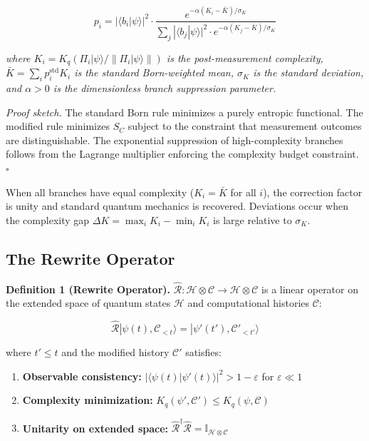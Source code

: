 \documentclass[12pt,a4paper]{article}
\newcommand{\ket}[1]{|#1\rangle}
\newcommand{\braket}[2]{\langle#1|#2\rangle}
\begin{document}
\begin{equation}
p_i = |\braket{b_i}{\psi}|^2 \cdot \frac{e^{-\alpha (K_i - \bar{K})/\sigma_K}}{\sum_j |\braket{b_j}{\psi}|^2 \cdot e^{-\alpha (K_j - \bar{K})/\sigma_K}}
\label{eq:born}
\end{equation}

\textit{where $K_i = K_q(\Pi_i\ket{\psi}/\|\Pi_i\ket{\psi}\|)$ is the post-measurement complexity, $\bar{K} = \sum_i p_i^{\text{std}} K_i$ is the standard Born-weighted mean, $\sigma_K$ is the standard deviation, and $\alpha > 0$ is the dimensionless branch suppression parameter.}

\textit{Proof sketch.} The standard Born rule minimizes a purely entropic functional. The modified rule minimizes $S_C$ subject to the constraint that measurement outcomes are distinguishable. The exponential suppression of high-complexity branches follows from the Lagrange multiplier enforcing the complexity budget constraint. $\square$

When all branches have equal complexity ($K_i = \bar{K}$ for all $i$), the correction factor is unity and standard quantum mechanics is recovered. Deviations occur when the complexity gap $\Delta K = \max_i K_i - \min_i K_i$ is large relative to $\sigma_K$.

\subsection{The Rewrite Operator}

\textbf{Definition 1 (Rewrite Operator).} $\hat{\mathcal{R}}: \mathcal{H} \otimes \mathcal{C} \to \mathcal{H} \otimes \mathcal{C}$ is a linear operator on the extended space of quantum states $\mathcal{H}$ and computational histories $\mathcal{C}$:

\begin{equation}
\hat{\mathcal{R}}\ket{\psi(t), \mathcal{C}_{<t}} = \ket{\psi'(t'), \mathcal{C}'_{<t'}}
\end{equation}

where $t' \leq t$ and the modified history $\mathcal{C}'$ satisfies:
\begin{enumerate}
    \item \textbf{Observable consistency:} $|\braket{\psi(t)}{\psi'(t)}|^2 > 1 - \varepsilon$ for $\varepsilon \ll 1$
    \item \textbf{Complexity minimization:} $K_q(\psi', \mathcal{C}') \leq K_q(\psi, \mathcal{C})$
    \item \textbf{Unitarity on extended space:} $\hat{\mathcal{R}}^\dagger \hat{\mathcal{R}} = \mathbb{I}_{\mathcal{H} \otimes \mathcal{C}}$
\end{enumerate}
\end{document}
